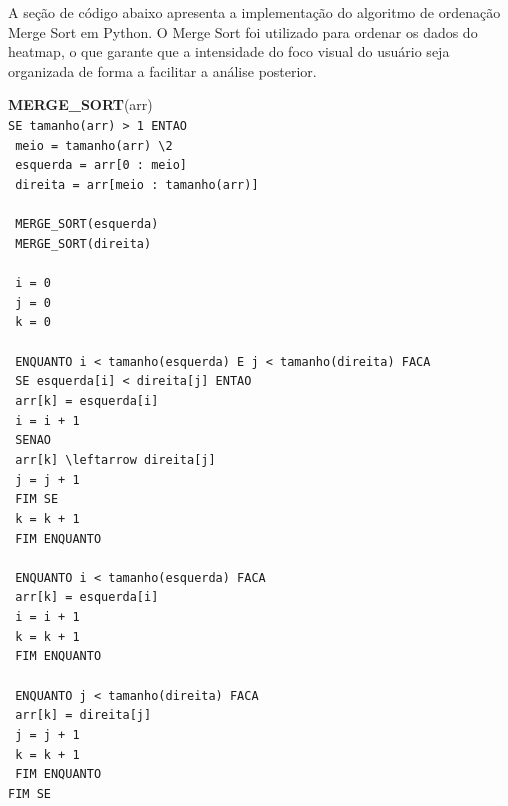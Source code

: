 A seção de código abaixo apresenta a implementação do algoritmo de ordenação Merge Sort em Python. O Merge Sort foi utilizado para ordenar os dados do heatmap, o que garante que a intensidade do foco visual do usuário seja organizada de forma a facilitar a análise posterior.

\noindent
\textbf{MERGE\_SORT}(arr)\\
\texttt{SE tamanho(arr) > 1 ENTAO}\\
\texttt{    meio = tamanho(arr) \textbackslash 2}\\
\texttt{    esquerda = arr[0 : meio]}\\
\texttt{    direita = arr[meio : tamanho(arr)]}\\
\\
\texttt{    MERGE\_SORT(esquerda)}\\
\texttt{    MERGE\_SORT(direita)}\\
\\
\texttt{    i = 0}\\
\texttt{    j = 0}\\
\texttt{    k = 0}\\
\\
\texttt{    ENQUANTO i < tamanho(esquerda) E j < tamanho(direita) FACA}\\
\texttt{        SE esquerda[i] < direita[j] ENTAO}\\
\texttt{            arr[k] = esquerda[i]}\\
\texttt{            i = i + 1}\\
\texttt{        SENAO}\\
\texttt{            arr[k] \textbackslash leftarrow direita[j]}\\
\texttt{            j = j + 1}\\
\texttt{        FIM SE}\\
\texttt{        k = k + 1}\\
\texttt{    FIM ENQUANTO}\\
\\
\texttt{    ENQUANTO i < tamanho(esquerda) FACA}\\
\texttt{        arr[k] = esquerda[i]}\\
\texttt{        i = i + 1}\\
\texttt{        k = k + 1}\\
\texttt{    FIM ENQUANTO}\\
\\
\texttt{    ENQUANTO j < tamanho(direita) FACA}\\
\texttt{        arr[k] = direita[j]}\\
\texttt{        j = j + 1}\\
\texttt{        k = k + 1}\\
\texttt{    FIM ENQUANTO}\\
\texttt{FIM SE}

